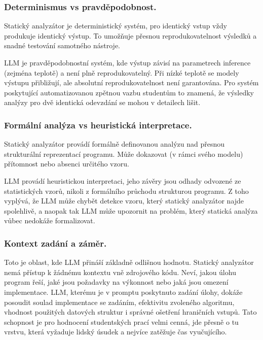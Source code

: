 \subsubsection*{Determinismus vs pravděpodobnost.}
\label{subsubsec:determinism-vs-probability}

Statický analyzátor je deterministický systém, pro identický vstup vždy produkuje identický výstup.
To umožňuje přesnou reprodukovatelnost výsledků a snadné testování samotného nástroje.

LLM je pravděpodobnostní systém, kde výstup závisí na parametrech inference (zejména teplotě) a není plně reprodukovatelný.
Při nízké teplotě se modely výstupu přibližují, ale absolutní reprodukovatelnost není garantována.
Pro systém poskytující automatizovanou zpětnou vazbu studentům to znamená, že výsledky analýzy pro dvě identická odevzdání se mohou v detailech lišit.

\subsubsection*{Formální analýza vs heuristická interpretace.}
\label{subsubsec:formal-vs-heuristic}

Statický analyzátor provádí formálně definovanou analýzu nad přesnou strukturální reprezentací programu.
Může dokazovat (v rámci svého modelu) přítomnost nebo absenci určitého vzoru.

LLM provádí heuristickou interpretaci, jeho závěry jsou odhady odvozené ze statistických vzorů, nikoli z formálního průchodu strukturou programu.
Z toho vyplývá, že LLM může chybět detekce vzoru, který statický analyzátor najde spolehlivě, a naopak tak LLM může upozornit na problém, který statická analýza vůbec nedokáže formalizovat.

\subsubsection*{Kontext zadání a záměr.}
\label{subsubsec:context}

Toto je oblast, kde LLM přináší základně odlišnou hodnotu.
Statický analyzátor nemá přístup k žádnému kontextu vně zdrojového kódu.
Neví, jakou úlohu program řeší, jaké jsou požadavky na výkonnost nebo jaká jsou omezení implementace.
LLM, kterému je v promptu poskytnuto zadání úlohy, dokáže posoudit soulad implementace se zadáním, efektivitu zvoleného algoritmu, vhodnost použitých datových struktur i správné ošetření hraničních vstupů.
Tato schopnost je pro hodnocení studentských prací velmi cenná, jde přesně o tu vrstvu, která vyžaduje lidský úsudek a nejvíce zatěžuje čas vyučujícího.

